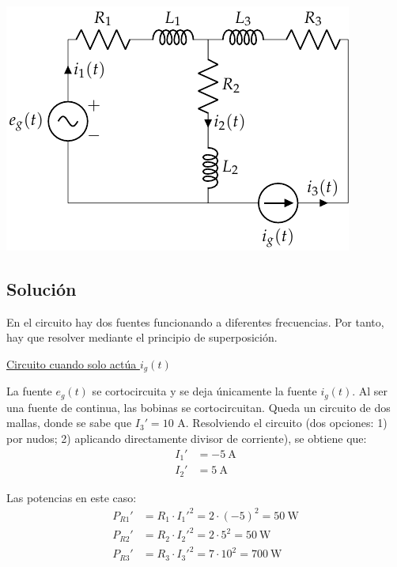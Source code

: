 \begin{center}
  \includegraphics{figuras/BT2_18.pdf}
\end{center}

\subsection*{Solución}

En el circuito hay dos fuentes funcionando a diferentes frecuencias. Por tanto, hay que resolver mediante el principio de superposición.

\vspace{2mm}
\underline{Circuito cuando solo actúa $i_g(t)$}

\vspace{2mm}
La fuente $e_g(t)$ se cortocircuita y se deja únicamente la fuente
$i_g(t)$. Al ser una fuente de continua, las bobinas se
cortocircuitan. Queda un circuito de dos mallas, donde se sabe que
$I_3'=10$ A. Resolviendo el circuito (dos opciones: 1) por nudos; 2) aplicando directamente divisor de corriente), se obtiene que:
\begin{align*}
  I_1'&= \qty{-5}{\ampere}\\
  I_2'&= \qty{5}{\ampere}
\end{align*}
    
Las potencias en este caso:
\begin{align*}
  P_{R1}'&=R_1\cdot I_1'^2=2\cdot (-5)^2=\qty{50}{\watt}\\
  P_{R2}'&=R_2\cdot I_2'^2=2\cdot 5^2=\qty{50}{\watt}\\
  P_{R3}'&=R_3\cdot I_3'^2=7\cdot 10^2=\qty{700}{\watt}\\
\end{align*}

